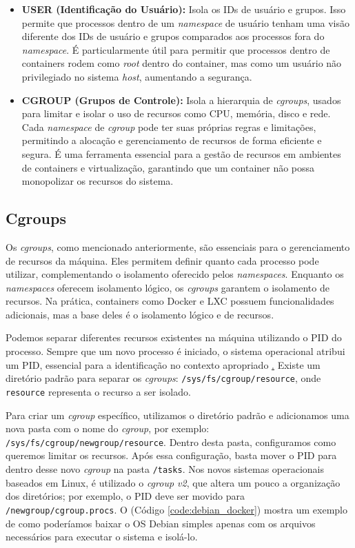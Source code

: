 \begin{itemize}
  \item \textbf{USER (Identificação do Usuário):} Isola os IDs de usuário e grupos. Isso permite que processos dentro de um \textit{namespace} de usuário tenham uma visão diferente dos IDs de usuário e grupos comparados aos processos fora do \textit{namespace}. É particularmente útil para permitir que processos dentro de containers rodem como \textit{root} dentro do container, mas como um usuário não privilegiado no sistema \textit{host}, aumentando a segurança.
  
  \item \textbf{CGROUP (Grupos de Controle):} Isola a hierarquia de \textit{cgroups}, usados para limitar e isolar o uso de recursos como CPU, memória, disco e rede. Cada \textit{namespace} de \textit{cgroup} pode ter suas próprias regras e limitações, permitindo a alocação e gerenciamento de recursos de forma eficiente e segura. É uma ferramenta essencial para a gestão de recursos em ambientes de containers e virtualização, garantindo que um container não possa monopolizar os recursos do sistema.
\end{itemize}

\subsection{Cgroups}

Os \textit{cgroups}, como mencionado anteriormente, são essenciais para o gerenciamento de recursos da máquina. Eles permitem definir quanto cada processo pode utilizar, complementando o isolamento oferecido pelos \textit{namespaces}. Enquanto os \textit{namespaces} oferecem isolamento lógico, os \textit{cgroups} garantem o isolamento de recursos. Na prática, containers como Docker e LXC possuem funcionalidades adicionais, mas a base deles é o isolamento lógico e de recursos.

Podemos separar diferentes recursos existentes na máquina utilizando o PID do processo. Sempre que um novo processo é iniciado, o sistema operacional atribui um PID, essencial para a identificação no contexto apropriado \href{https://docs.kernel.org/admin-guide/cgroup-v1/cgroups.html}. Existe um diretório padrão para separar os \textit{cgroups}: \texttt{/sys/fs/cgroup/resource}, onde \texttt{resource} representa o recurso a ser isolado.

Para criar um \textit{cgroup} específico, utilizamos o diretório padrão e adicionamos uma nova pasta com o nome do \textit{cgroup}, por exemplo: \texttt{/sys/fs/cgroup/newgroup/resource}. Dentro desta pasta, configuramos como queremos limitar os recursos. Após essa configuração, basta mover o PID para dentro desse novo \textit{cgroup} na pasta \texttt{/tasks}. Nos novos sistemas operacionais baseados em Linux, é utilizado o \textit{cgroup v2}, que altera um pouco a organização dos diretórios; por exemplo, o PID deve ser movido para \texttt{/newgroup/cgroup.procs}. O (Código \ref{code:debian_docker}) mostra um exemplo de como poderíamos baixar o OS Debian simples apenas com os arquivos necessários para executar o sistema e isolá-lo.


